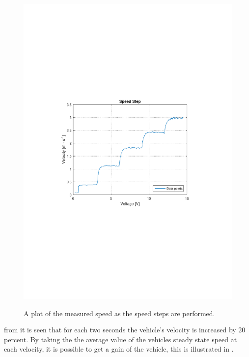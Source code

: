\begin{figure}[H]
  \centering
  {
    \includegraphics[width=1.4\textwidth]{figures/SpeedStep.pdf}
  }
  \caption{A plot of the measured speed as the speed steps are performed.}
  \label{SpeedStepGainTest}
\end{figure}

from  it is seen that for each two seconds the vehicle's velocity is increased by 20 percent. By taking the the average value of the vehicles steady state speed at each velocity, it is possible to get a gain of the vehicle, this is illustrated in .

